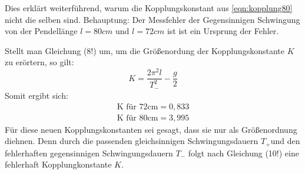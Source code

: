 Dies erklärt weiterführend, warum die Kopplungskonstant aus \ref{eqn:kopplung80} nicht die selben
sind.
Behauptung: Der Messfehler der Gegensinnigen Schwingung von der Pendellänge $l=80cm$ und $l=72cm$ ist 
ist ein Ursprung der Fehler.

Stellt man Gleichung (8!) um, um die Größenordung der Kopplungskonstante $K$ zu erörtern, so gilt:
\begin{equation}
    K=\frac{2\pi^2l}{T_{-}^2}-\frac{g}{2}
\end{equation}
Somit ergibt sich:
\begin{align*}
    \textrm{K für 72cm} = 0,833\\
    \textrm{K für 80cm} = 3,995 
\end{align*}
Für diese neuen Kopplungskonstanten sei gesagt, dass sie nur als Größenordnung diehnen.
Denn durch die passenden gleichsinnigen Schwingungsdauern $T_+$und den fehlerhaften gegensinnigen Schwingungsdauern $T_-$
folgt nach Gleichung (10!) eine fehlerhaft Kopplungkonstante $K$.
 
